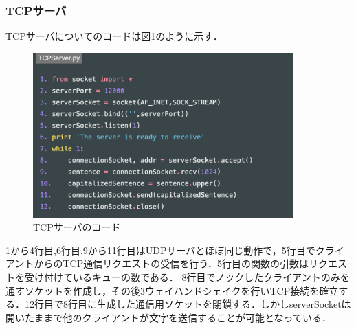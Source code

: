 \documentclass[9pt,a4j,twocolumn]{jsarticle}
\begin{document}
\subsubsection{TCPサーバ}
TCPサーバについてのコードは図\ref{fig:tcp_server}のように示す．
\begin{figure}[tb]
\includegraphics[width=10cm]{TCPServer.png}
 \caption{TCPサーバのコード}
 \label{fig:tcp_server}
\end{figure}
1から4行目,6行目,9から11行目はUDPサーバとほぼ同じ動作で，5行目でクライアントからのTCP通信リクエストの受信を行う．5行目の関数の引数はリクエストを受け付けているキューの数である．
8行目でノックしたクライアントのみを通すソケットを作成し，その後3ウェイハンドシェイクを行いTCP接続を確立する．12行目で8行目に生成した通信用ソケットを閉鎖する．しかしserverSocketは開いたままで他のクライアントが文字を送信することが可能となっている．
\end{document}
